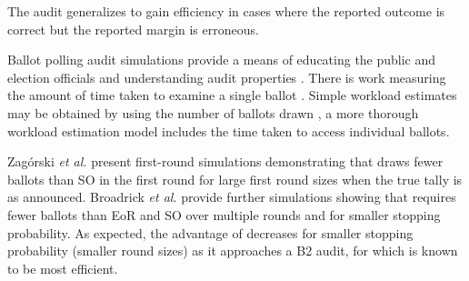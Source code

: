 The \ALPHA audit \cite{alpha} generalizes \BRAVO to gain efficiency in cases where the reported outcome is correct but the reported margin is erroneous.

 Ballot polling audit simulations provide a means of educating the public and election officials \cite{dice} and understanding audit properties \cite{mclaughlin_thesis,simulations_house, blom_IRV, DBLP:conf/evoteid/HuangRSTV20,bravo}. There is work measuring the amount of time taken to examine a single ballot \cite{RI-report}. 
Simple workload estimates may be obtained by using the number of ballots drawn \cite{bernoulli-ballot-polling}, a more thorough workload estimation model includes the time taken to access individual ballots\cite{bernhard-diss}. 

Zag\'{o}rski {\em et al.}  present first-round simulations demonstrating that \Minerva draws fewer ballots than SO \BRAVO in the first round for large first round sizes when the true tally is as announced. Broadrick {\em et al.} provide further simulations showing that \Minerva requires fewer ballots than EoR and SO \BRAVO over multiple rounds and for smaller stopping probability. As expected, the advantage of \Minerva decreases for smaller stopping probability (smaller round sizes) as it approaches a B2 audit, 
for which \BRAVO is known to be most efficient. 

